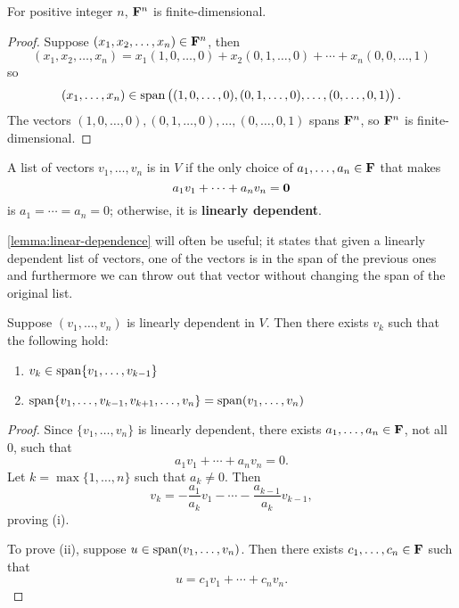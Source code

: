 \begin{exercise}
For positive integer $n$, $\mathbf F^n$ is finite-dimensional.
\end{exercise}

\begin{proof}
Suppose $(x_1,x_2,\dots,x_n)\in\mathbf F^n$, then
\[(x_1,x_2,\dots,x_n)=x_1(1,0,\dots,0)+x_2(0,1,\dots,0)+\cdots+x_n(0,0,\dots,1)\]
so
\[(x_1,\dots,x_n)\in\operatorname{span}\left((1,0,\dots,0),(0,1,\dots,0),\dots,(0,\dots,0,1)\right).\]
The vectors $(1,0,\dots,0),(0,1,\dots,0),\dots,(0,\dots,0,1)$ spans $\mathbf F^n$, so $\mathbf F^n$ is finite-dimensional.
\end{proof}

\begin{definition}
A list of vectors $v_1,\dots,v_n$ is  in $V$ if the only choice of $a_1,\dots,a_n\in\mathbf F$ that makes
\[a_1v_1+\cdots+a_nv_n=\vb{0}\]
is $a_1=\cdots=a_n=0$; otherwise, it is \textbf{linearly dependent}.
\end{definition}

\cref{lemma:linear-dependence} will often be useful; it states that given a linearly dependent list of vectors, one of the vectors is in the span of the previous ones and furthermore we can throw out that vector without changing the span of the original list.

\begin{lemma}\label{lemma:linear-dependence}
Suppose $(v_1,\dots,v_n)$ is linearly dependent in $V$. Then there exists $v_k$ such that the following hold:
\begin{enumerate}[label=(\roman*)]
\item $v_k\in\operatorname{span}\{v_1,\dots,v_{k-1}\}$
\item $\operatorname{span}\{v_1,\dots,v_{k-1},v_{k+1},\dots,v_n\}=\operatorname{span}(v_1,\dots,v_n)$
\end{enumerate}
\end{lemma}

\begin{proof}
Since $\{v_1,\dots,v_n\}$ is linearly dependent, there exists $a_1,\dots,a_n\in\mathbf F$, not all $0$, such that
\[a_1v_1+\cdots+a_nv_n=0.\]
Let $k=\max\{1,\dots,n\}$ such that $a_k\neq0$. Then
\[v_k=-\frac{a_1}{a_k}v_1-\cdots-\frac{a_{k-1}}{a_k}v_{k-1},\]
proving (i).

To prove (ii), suppose $u\in\operatorname{span}(v_1,\dots,v_n)$. Then there exists $c_1,\dots,c_n\in\mathbf F$ such that
\[u=c_1v_1+\cdots+c_nv_n.\]

\end{proof}

